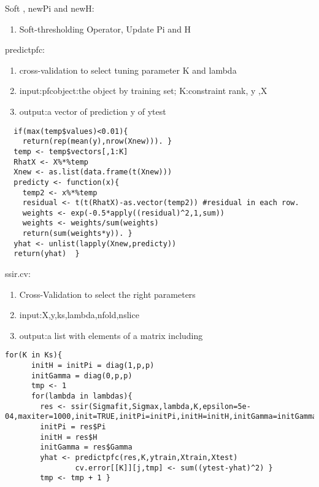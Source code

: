 \documentclass[lang=cn,11pt,a4paper]{elegantpaper}
\newcommand{\Blue}[1]{\textcolor[rgb]{0,0,0.803}{#1}}
\begin{document}

\Blue{\large  Soft , newPi and newH:  } 
\begin{enumerate}
    \item Soft-thresholding Operator, Update Pi and H
\end{enumerate}



\Blue{\large  predictpfc:} 
\begin{enumerate}
    \item cross-validation to select tuning parameter K and lambda
\item input:pfcobject:the object by training set; K:constraint rank, y ,X
\item output:a vector of prediction y of ytest  
\end{enumerate}

\begin{lstlisting}
  if(max(temp$values)<0.01){
    return(rep(mean(y),nrow(Xnew))). }
  temp <- temp$vectors[,1:K]
  RhatX <- X%*%temp
  Xnew <- as.list(data.frame(t(Xnew)))
  predicty <- function(x){ 		
    temp2 <- x%*%temp	
    residual <- t(t(RhatX)-as.vector(temp2)) #residual in each row.
    weights <- exp(-0.5*apply((residual)^2,1,sum))
    weights <- weights/sum(weights)
    return(sum(weights*y)). }
  yhat <- unlist(lapply(Xnew,predicty))
  return(yhat)	} 
\end{lstlisting}


\Blue{\large  ssir.cv:} 
\begin{enumerate}
    \item Cross-Validation to select the right parameters
\item input:X,y,ks,lambda,nfold,nslice
\item output:a list with elements of a matrix including
\end{enumerate}

\begin{lstlisting}
for(K in Ks){
      initH = initPi = diag(1,p,p)
      initGamma = diag(0,p,p)
      tmp <- 1
      for(lambda in lambdas){
        res <- ssir(Sigmafit,Sigmax,lambda,K,epsilon=5e-04,maxiter=1000,init=TRUE,initPi=initPi,initH=initH,initGamma=initGamma,trace=FALSE)
        initPi = res$Pi
        initH = res$H
        initGamma = res$Gamma
        yhat <- predictpfc(res,K,ytrain,Xtrain,Xtest)
                cv.error[[K]][j,tmp] <- sum((ytest-yhat)^2) }
        tmp <- tmp + 1 }
\end{lstlisting}
\end{document}
